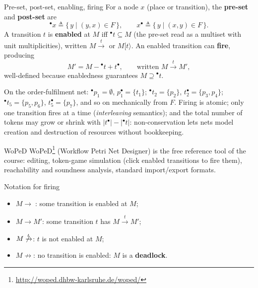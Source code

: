 \begin{definitionbox}{Pre-set, post-set, enabling, firing}
For a node $x$ (place or transition), the \textbf{pre-set} and \textbf{post-set} are
\[
  {}^\bullet x \triangleq \{\, y \mid (y, x) \in F \,\}, \qquad x^\bullet \triangleq \{\, y \mid (x, y) \in F \,\}.
\]
A transition $t$ is \textbf{enabled} at $M$ iff ${}^\bullet t \subseteq M$ (the pre-set read as a multiset with unit multiplicities), written $M \xrightarrow{t}$ or $M[t\rangle$. An enabled transition can \textbf{fire}, producing
\[
  M' = M - {}^\bullet t + t^\bullet, \qquad \text{written } M \xrightarrow{t} M',
\]
well-defined because enabledness guarantees $M \supseteq {}^\bullet t$.
\end{definitionbox}

On the order-fulfilment net: ${}^\bullet p_1 = \emptyset$, $p_1^\bullet = \{t_1\}$; ${}^\bullet t_2 = \{p_2\}$, $t_2^\bullet = \{p_3, p_4\}$; ${}^\bullet t_5 = \{p_5, p_6\}$, $t_5^\bullet = \{p_7\}$, and so on mechanically from $F$. Firing is atomic; only one transition fires at a time (\emph{interleaving} semantics); and the total number of tokens may grow or shrink with $|t^\bullet| - |{}^\bullet t|$: non-conservation lets nets model creation and destruction of resources without bookkeeping.

\begin{notebox}{WoPeD}
WoPeD\footnote{\url{http://woped.dhbw-karlsruhe.de/woped/}} (Workflow Petri Net Designer) is the free reference tool of the course: editing, token-game simulation (click enabled transitions to fire them), reachability and soundness analysis, standard import/export formats.
\end{notebox}

\begin{definitionbox}{Notation for firing}
\begin{itemize}
  \item $M \to\;$: some transition is enabled at $M$;
  \item $M \to M'$: some transition $t$ has $M \xrightarrow{t} M'$;
  \item $M \not\xrightarrow{t}$: $t$ is not enabled at $M$;
  \item $M \not\to$: no transition is enabled: $M$ is a \textbf{deadlock}.
\end{itemize}
\end{definitionbox}


